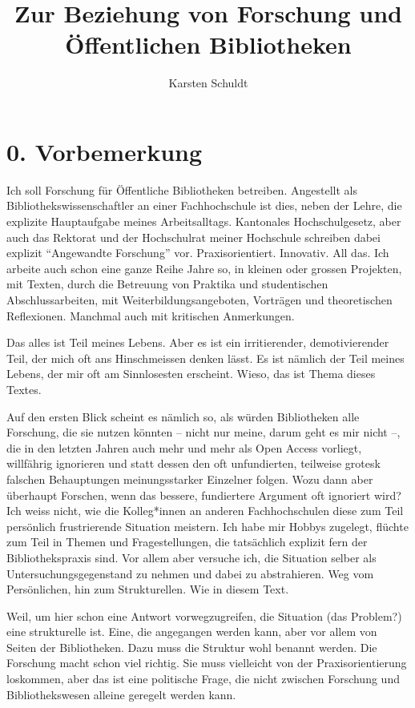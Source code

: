 \documentclass[a4paper,
fontsize=11pt,
oneside,
numbers=noperiodatend,
parskip=half-,
bibliography=totoc,
final
]{scrartcl}
\title{\LARGE{Zur Beziehung von Forschung und Öffentlichen Bibliotheken}}%
\author{Karsten Schuldt} %
\date{}
\begin{document}
\maketitle
\thispagestyle{fancyplain} 


\hypertarget{vorbemerkung}{%
\section{0. Vorbemerkung}\label{vorbemerkung}}

Ich soll Forschung für Öffentliche Bibliotheken betreiben. Angestellt
als Bibliothekswissenschaftler an einer Fachhochschule ist dies, neben
der Lehre, die explizite Hauptaufgabe meines Arbeitsalltags. Kantonales
Hochschulgesetz, aber auch das Rektorat und der Hochschulrat meiner
Hochschule schreiben dabei explizit \enquote{Angewandte Forschung} vor.
Praxisorientiert. Innovativ. All das. Ich arbeite auch schon eine ganze
Reihe Jahre so, in kleinen oder grossen Projekten, mit Texten, durch die
Betreuung von Praktika und studentischen Abschlussarbeiten, mit
Weiterbildungsangeboten, Vorträgen und theoretischen Reflexionen.
Manchmal auch mit kritischen Anmerkungen.

Das alles ist Teil meines Lebens. Aber es ist ein irritierender,
demotivierender Teil, der mich oft ans Hinschmeissen denken lässt. Es
ist nämlich der Teil meines Lebens, der mir oft am Sinnlosesten
erscheint. Wieso, das ist Thema dieses Textes.

Auf den ersten Blick scheint es nämlich so, als würden Bibliotheken alle
Forschung, die sie nutzen könnten -- nicht nur meine, darum geht es mir
nicht --, die in den letzten Jahren auch mehr und mehr als Open Access
vorliegt, willfährig ignorieren und statt dessen den oft unfundierten,
teilweise grotesk falschen Behauptungen meinungsstarker Einzelner
folgen. Wozu dann aber überhaupt Forschen, wenn das bessere, fundiertere
Argument oft ignoriert wird? Ich weiss nicht, wie die Kolleg*innen an
anderen Fachhochschulen diese zum Teil persönlich frustrierende
Situation meistern. Ich habe mir Hobbys zugelegt, flüchte zum Teil in
Themen und Fragestellungen, die tatsächlich explizit fern der
Bibliothekspraxis sind. Vor allem aber versuche ich, die Situation
selber als Untersuchungsgegenstand zu nehmen und dabei zu abstrahieren.
Weg vom Persönlichen, hin zum Strukturellen. Wie in diesem Text.

Weil, um hier schon eine Antwort vorwegzugreifen, die Situation (das
Problem?) eine strukturelle ist. Eine, die angegangen werden kann, aber
vor allem von Seiten der Bibliotheken. Dazu muss die Struktur wohl
benannt werden. Die Forschung macht schon viel richtig. Sie muss
vielleicht von der Praxisorientierung loskommen, aber das ist eine
politische Frage, die nicht zwischen Forschung und Bibliothekswesen
alleine geregelt werden kann.
\end{document}
